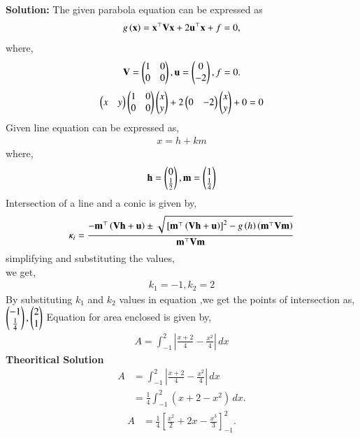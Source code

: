 \documentclass[journal]{IEEEtran}
\begin{document}
\textbf{Solution:}
The given parabola equation can be expressed as
\begin{align}
    g\left(\mathbf{x}\right)= \mathbf{x}^{\top}\mathbf{V}\mathbf{x}+2\mathbf{u}^{\top}\mathbf{x}+f=0,
\end{align}
where,
\begin{align}
    \mathbf{V}=\begin{pmatrix}1 & 0 \\ 0 & 0 \end{pmatrix}, \mathbf{u}=\begin{pmatrix}0\\ {-2}\end{pmatrix}, f=0.  
\end{align}
\begin{align}
  \begin{pmatrix}x&y\end{pmatrix}\begin{pmatrix}1&0\\0&0\end{pmatrix}\begin{pmatrix}x\\y\end{pmatrix}+2\begin{pmatrix}0 & -{2}\end{pmatrix}\begin{pmatrix}x\\y\end{pmatrix}+0=0
\end{align}
Given line equation can be expressed as,
\begin{align}
    x=h+km
\end{align}
where,
\begin{align}
    \mathbf{h}=\begin{pmatrix}0\\ \frac{1}{2}\end{pmatrix},\mathbf{m}=\begin{pmatrix}1\\ \frac{1}{4}\end{pmatrix}
\end{align}
Intersection of a line and a conic is given by,
\begin{align}
  \kappa_i=\frac{-\mathbf{m}^{\top}\left(\mathbf{Vh}+\mathbf{u}\right)\pm\sqrt{{}\left[\mathbf{m}^{\top}\left(\mathbf{Vh}+\mathbf{u}\right)\right]^2-g\left(h\right)\left(\mathbf{m}^{\top}\mathbf{Vm}\right)}}{\mathbf{m}^{\top}\mathbf{Vm}}
\end{align}
simplifying and substituting the values,\\
we get,
\begin{align}
    k_1={-1},k_2=2
\end{align}
By substituting $k_1$ and $k_2$ values in equation ,we get the points of intersection as, $\begin{pmatrix}-1\\\frac{1}{4}\end{pmatrix}, \begin{pmatrix}2\\1\end{pmatrix}$
Equation for area enclosed is given by,
\begin{align}
    A = \int_{-1}^2 \left| \frac{x + 2}{4} - \frac{x^2}{4} \right| \, dx
\end{align}
\textbf{Theoritical Solution}
\begin{align}
A &= \int_{-1}^2 \left| \frac{x + 2}{4} - \frac{x^2}{4} \right| \, dx \\
&= \frac{1}{4} \int_{-1}^2 \left( x + 2 - x^2 \right) \, dx.
\end{align}
\begin{align}
A &= \frac{1}{4} \left[ \frac{x^2}{2} + 2x - \frac{x^3}{3} \right]_{-1}^2.
\end{align}
\end{document}
